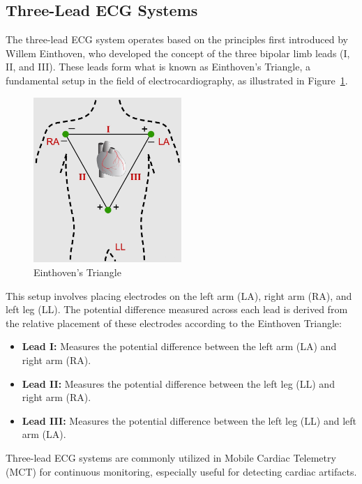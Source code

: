 \subsection{Three-Lead ECG Systems}\label{einthoven}
\vspace{1em}
\noindent The three-lead ECG system operates based on the principles first introduced by Willem Einthoven, who developed the concept of the three bipolar limb leads (I, II, and III). These leads form what is known as Einthoven's Triangle, a fundamental setup in the field of electrocardiography, as illustrated in Figure~\ref{fig:einthoven_triangle}.

\begin{figure}[h]
	\centering
	\includegraphics[width=0.5\textwidth]{images/einthoven traingle}
	\caption{Einthoven's Triangle~\cite{cvphysiology}}
	\label{fig:einthoven_triangle}
\end{figure}

\noindent This setup involves placing electrodes on the left arm (LA), right arm (RA), and left leg (LL). The potential difference measured across each lead is derived from the relative placement of these electrodes according to the Einthoven Triangle:\\
\begin{itemize}
	\item \textbf{Lead I:} Measures the potential difference between the left arm (LA) and right arm (RA).
	\item \textbf{Lead II:} Measures the potential difference between the left leg (LL) and right arm (RA).
	\item \textbf{Lead III:} Measures the potential difference between the left leg (LL) and left arm (LA).
\end{itemize}

\noindent Three-lead ECG systems are commonly utilized in Mobile Cardiac Telemetry (MCT) for continuous monitoring, especially useful for detecting cardiac artifacts\cite[chap. 1, p. 4]{conover2002}\cite{tsang2013}.\\

